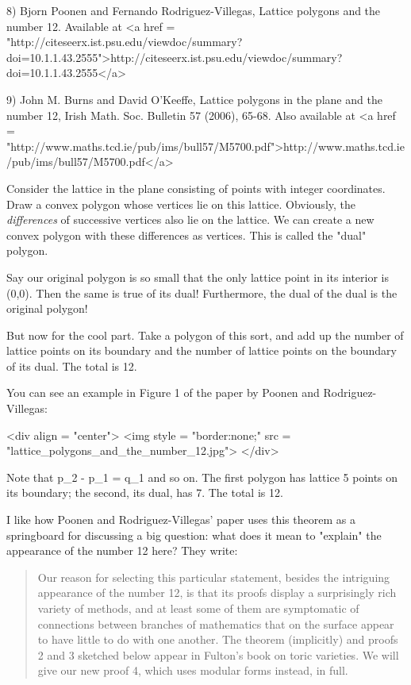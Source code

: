 8) Bjorn Poonen and Fernando Rodriguez-Villegas, Lattice polygons
and the number 12.  Available at 
<a href = "http://citeseerx.ist.psu.edu/viewdoc/summary?doi=10.1.1.43.2555">http://citeseerx.ist.psu.edu/viewdoc/summary?doi=10.1.1.43.2555</a>

9) John M. Burns and David O'Keeffe, Lattice polygons in the plane
and the number 12, Irish Math. Soc. Bulletin 57 (2006), 65-68.
Also available at <a href = "http://www.maths.tcd.ie/pub/ims/bull57/M5700.pdf">http://www.maths.tcd.ie/pub/ims/bull57/M5700.pdf</a>

Consider the lattice in the plane consisting of points with integer
coordinates.  Draw a convex polygon whose vertices lie on this lattice.   
Obviously, the \emph{differences} of successive vertices also lie on the 
lattice.  We can create a new convex polygon with these differences as 
vertices.  This is called the "dual" polygon.  

Say our original polygon is so small that the only lattice point in its
interior is (0,0).  Then the same is true of its dual!  Furthermore, 
the dual of the dual is the original polygon!

But now for the cool part.  Take a polygon of this sort, and add up the 
number of lattice points on its boundary and the number of lattice 
points on the boundary of its dual.  The total is 12.

You can see an example in Figure 1 of the paper by Poonen and
Rodriguez-Villegas:

<div align = "center">
<img style = "border:none;" src = "lattice_polygons_and_the_number_12.jpg">
</div>

Note that p_{2} - p_{1} = q_{1} and so on.
The first polygon has lattice 5 points on its boundary; the second,
its dual, has 7.  The total is 12.   

I like how Poonen and Rodriguez-Villegas' paper uses this theorem as a
springboard for discussing a big question: what does it mean to
"explain" the appearance of the number 12 here?
They write:

\begin{quote}
   Our reason for selecting this particular statement, besides the 
   intriguing appearance of the number 12, is that its proofs display 
   a surprisingly rich variety of methods, and at least some of them 
   are symptomatic of connections between branches of mathematics that 
   on the surface appear to have little to do with one another.  The 
   theorem (implicitly) and proofs 2 and 3 sketched below appear in 
   Fulton's book on toric varieties.  We will give our new proof 4, 
   which uses modular forms instead, in full.
\end{quote}

